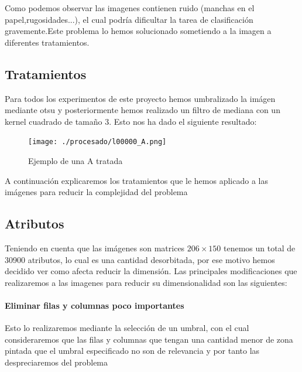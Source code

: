 \documentclass[8pt,a4paper]{article}
\begin{document}
Como podemos observar las imagenes contienen ruido (manchas en el papel,rugosidades...), el cual podría dificultar la tarea de clasificación gravemente.Este problema lo hemos solucionado sometiendo a la imagen a diferentes tratamientos.

\subsection{Tratamientos}

Para todos los experimentos de este proyecto hemos umbralizado la imágen mediante otsu y posteriormente hemos realizado un filtro de mediana con un kernel cuadrado de tamaño 3.
Esto nos ha dado el siguiente resultado:
\begin{figure}[htbp]
	\centering
    \texttt{[image: ./procesado/l00000\_A.png]}
    \caption{Ejemplo de una A tratada}
\end{figure}

A continuación explicaremos los tratamientos que le hemos aplicado a las imágenes para reducir la complejidad del problema

\subsection{Atributos}
Teniendo en cuenta que las imágenes son matrices $206\times150$ tenemos un total de 30900 atributos, lo cual es una cantidad desorbitada, por ese motivo hemos decidido ver como afecta reducir la dimensión.
Las principales modificaciones que realizaremos a las imagenes para reducir su dimensionalidad son las siguientes:

\paragraph{Eliminar filas y columnas poco importantes}


Esto lo realizaremos mediante la selección de un umbral, con el cual consideraremos que las filas y columnas que tengan una cantidad menor de zona pintada que el umbral especificado no son de relevancia y por tanto las despreciaremos del problema
\end{document}
